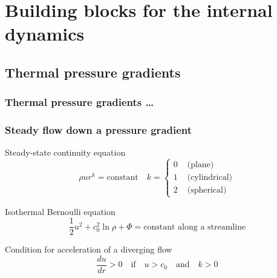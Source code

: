 \documentclass[presentation]{beamer}
\begin{document}
\section{Building blocks for the internal dynamics}

\subsection{Thermal pressure gradients}

\begin{frame}
  \frametitle{Thermal pressure gradients \dots}
\end{frame}

\begin{frame}[squeeze, shrink=5]
  \frametitle{Steady flow down a pressure gradient}
  \begin{block}{Steady-state continuity equation}
    \[
    \rho u r^k = \text{constant} \quad 
    k = \left\{\scriptstyle
      \begin{array}{ll}
        0 & \text{ (plane)}\\
        1 & \text{ (cylindrical)}\\
        2 & \text{ (spherical)}
      \end{array}
    \right.
    \]
  \end{block}
  \begin{block}{Isothermal Bernoulli equation}
    \[
    \frac12 u^2 + c_0^2 \ln \rho  + \Phi = \text{constant along a streamline}
    \]
  \end{block}
  \begin{block}{Condition for acceleration of a diverging flow}
    \[
    \frac{du}{dr} > 0  \quad \text{if} \quad u > c_0 \quad \text{and} \quad
    k > 0
    \]
  \end{block}
\end{frame}
\end{document}

